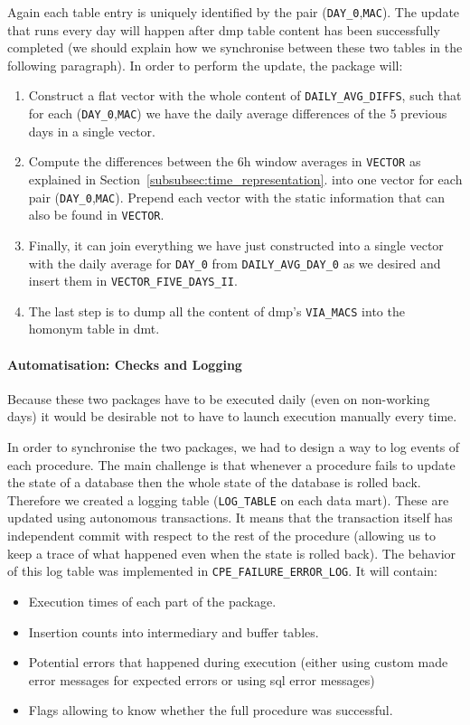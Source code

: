 Again each table entry is uniquely identified by the pair (\texttt{DAY\_0},\texttt{MAC}). The update that runs every day will happen after \acrshort{dmp} table content has been successfully completed (we should explain how we synchronise between these two tables in the following paragraph). In order to perform the update, the package will:
\begin{enumerate}
	\item Construct a flat vector with the whole content of \texttt{DAILY\_AVG\_DIFFS}, such that for each (\texttt{DAY\_0},\texttt{MAC}) we have the daily average differences of the 5 previous days in a single vector.
	\item Compute the differences between the 6h window averages in \texttt{VECTOR} as explained in Section~\ref{subsubsec:time_representation}. into one vector for each pair (\texttt{DAY\_0},\texttt{MAC}). Prepend each vector with the static information that can also be found in \texttt{VECTOR}.
	\item Finally, it can join everything we have just constructed into a single vector with the daily average for \texttt{DAY\_0} from \texttt{DAILY\_AVG\_DAY\_0} as we desired and insert them in \texttt{VECTOR\_FIVE\_DAYS\_II}.
	\item The last step is to dump all the content of \acrshort{dmp}'s \texttt{VIA\_MACS} into the homonym table in \acrshort{dmt}.
\end{enumerate}

\paragraph{Automatisation: Checks and Logging}
Because these two packages have to be executed daily (even on non-working days) it would be desirable not to have to launch execution manually every time. 

In order to synchronise the two packages, we had to design a way to log events of each procedure. The main challenge is that whenever a procedure fails to update the state of a database then the whole state of the database is rolled back. Therefore we created a logging table (\texttt{LOG\_TABLE} on each data mart). These are updated using autonomous transactions. It means that the transaction itself has independent commit with respect to the rest of the procedure (allowing us to keep a trace of what happened even when the state is rolled back). The behavior of this log table was implemented in \texttt{CPE\_FAILURE\_ERROR\_LOG}. It will contain:
\begin{itemize}[noitemsep]
	\item Execution times of each part of the package.
	\item Insertion counts into intermediary and buffer tables.
	\item Potential errors that happened during execution (either using custom made error messages for expected errors or using \acrshort{sql} error messages)
	\item Flags allowing to know whether the full procedure was successful. 
\end{itemize}		

